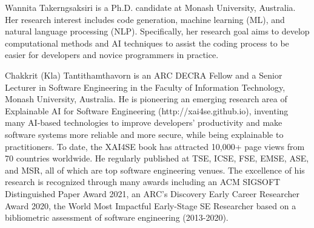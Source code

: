 \documentclass[10pt,journal,compsoc]{IEEEtran}
\begin{document}


\begin{IEEEbiography}{Wannita Takerngsaksiri}
is a Ph.D. candidate at Monash University, Australia. Her research interest includes code generation, machine learning (ML), and natural language processing (NLP).
Specifically, her research goal aims to develop computational methods and AI techniques to assist the coding process to be easier for developers and novice programmers in practice. 
\end{IEEEbiography}

\begin{IEEEbiography}{Chakkrit (Kla) Tantithamthavorn}
is an ARC DECRA Fellow and a Senior Lecturer in Software Engineering in the Faculty of Information Technology, Monash University, Australia. He is pioneering an emerging research area of Explainable AI for Software Engineering (http://xai4se.github.io), inventing many AI-based technologies to improve developers’ productivity and make software systems more reliable and more secure, while being explainable to practitioners. To date, the XAI4SE book has attracted 10,000+ page views from 70 countries worldwide. He regularly published at TSE, ICSE, FSE, EMSE, ASE, and MSR, all of which are top software engineering venues. The excellence of his research is recognized through many awards including an ACM SIGSOFT Distinguished Paper Award 2021, an ARC’s Discovery Early Career Researcher Award 2020, the World Most Impactful Early-Stage SE Researcher based on a bibliometric assessment of software engineering (2013-2020). 
\end{IEEEbiography}
\end{document}
